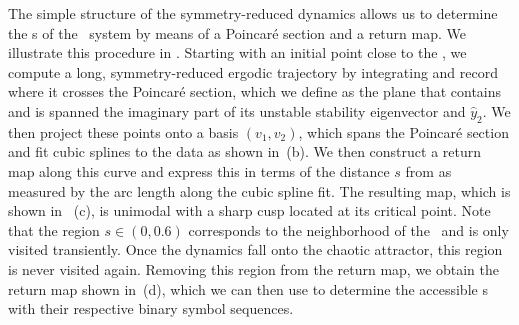 \documentclass[aip,cha,
reprint,
secnumarabic,
nofootinbib, tightenlines,
nobibnotes, showkeys, showpacs,
superscriptaddress,
]{revtex4-1}
\begin{document}
The simple structure of the symmetry-reduced dynamics allows us to
determine the \rpo s of the \twomode\ system by means of a 
Poincar\'e section and a return map. We illustrate this procedure in 
. Starting with an initial point close 
to the \REQV{}{}, we compute a long, symmetry-reduced ergodic 
trajectory by integrating  and record where 
it crosses the Poincar\'e section, which we define as the plane 
that contains \REQV{}{} and is spanned the imaginary part of its 
unstable stability eigenvector and $\hat{y}_2$. We then project 
these points onto a basis $(v_1, v_2)$, which spans the Poincar\'e 
section and fit cubic splines to the data as shown in 
\,(b). We then construct a return map 
along this curve and express this in terms of the distance $s$ from 
\REQV{}{} as measured by the arc length along the cubic spline fit. 
The resulting map, which is shown in \,
(c), is unimodal with a sharp cusp located at its critical point. 
Note that the region $s \in (0, 0.6)$ corresponds to the 
neighborhood of the \reqv\  and is only visited transiently. Once 
the dynamics fall onto the chaotic attractor, this region is never 
visited again. Removing this region from the return map, we obtain 
the return map shown in \,(d), which 
we can then use to determine the accessible \rpo s  with their 
respective binary symbol sequences.
\end{document}
